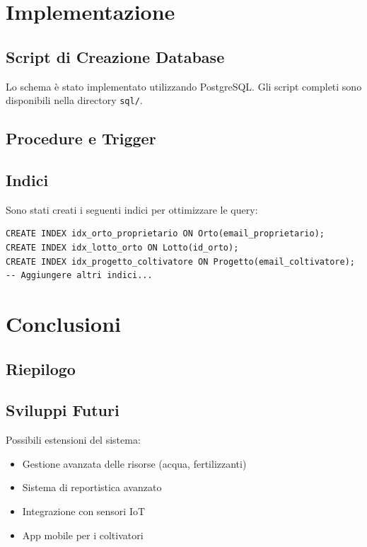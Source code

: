 \documentclass[12pt,a4paper]{article}
\begin{document}
\newpage

\section{Implementazione}

\subsection{Script di Creazione Database}

Lo schema è stato implementato utilizzando PostgreSQL. Gli script completi sono disponibili nella directory \texttt{sql/}.

\subsection{Procedure e Trigger}


\subsection{Indici}

Sono stati creati i seguenti indici per ottimizzare le query:

\begin{lstlisting}[style=sqlstyle]
CREATE INDEX idx_orto_proprietario ON Orto(email_proprietario);
CREATE INDEX idx_lotto_orto ON Lotto(id_orto);
CREATE INDEX idx_progetto_coltivatore ON Progetto(email_coltivatore);
-- Aggiungere altri indici...
\end{lstlisting}

\newpage

\section{Conclusioni}

\subsection{Riepilogo}


\subsection{Sviluppi Futuri}

Possibili estensioni del sistema:
\begin{itemize}
    \item Gestione avanzata delle risorse (acqua, fertilizzanti)
    \item Sistema di reportistica avanzato
    \item Integrazione con sensori IoT
    \item App mobile per i coltivatori
\end{itemize}
\end{document}
